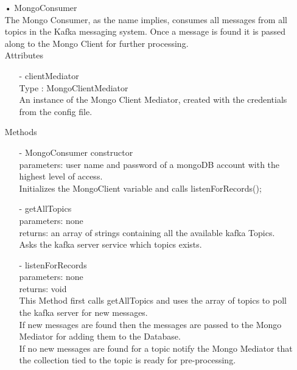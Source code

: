 \documentclass[oneside, english, final]{design}
\begin{document}
\begin{itemize}
	\item[•]MongoConsumer
	      \\The Mongo Consumer, as the name implies, consumes all messages from all topics in the Kafka messaging system. Once a message is found it is passed along to the Mongo Client for further processing.
	      \\Attributes
	      \begin{itemize}
		      \item[-]clientMediator
		            \\Type : MongoClientMediator
		            \\ An instance of the Mongo Client Mediator, created with the credentials from the config file.
	      \end{itemize}
	      Methods
	      \begin{itemize}
		      \item[-]MongoConsumer constructor
		            \\parameters: user name and password of a mongoDB account with the highest level of access.
		            \\ Initializes the MongoClient variable and calls listenForRecords();
		      \item[-]getAllTopics
		            \\parameters: none
		            \\returns: an array of strings containing all the available kafka Topics.
		            \\Asks the kafka server service which topics exists.
		      \item[-]listenForRecords
		            \\parameters: none
		            \\returns: void
		            \\This Method first calls getAllTopics and uses the array of topics to poll the kafka server for new messages.
		            \\If new messages are found then the messages are passed to the Mongo Mediator for adding them to the Database.
		            \\If no new messages are found for a topic notify the Mongo Mediator that the collection tied to the topic is ready for pre-processing.
	      \end{itemize}




\end{itemize}
\end{document}
